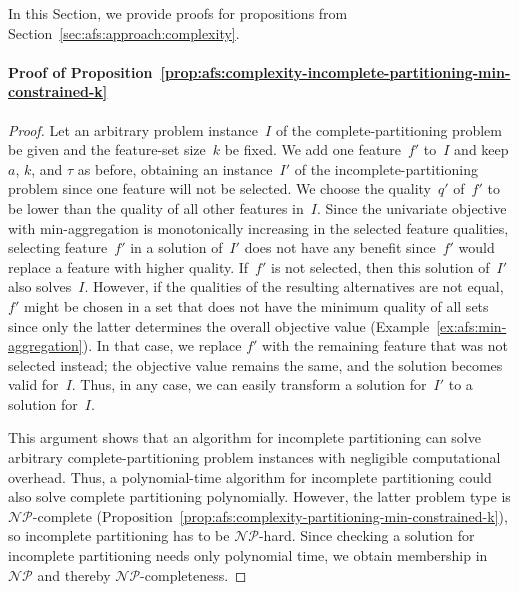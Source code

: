 \documentclass[iicol, sn-basic, Numbered]{sn-jnl} %
\theoremstyle{plain}
\theoremstyle{definition}
\begin{document}
\begin{appendices}
In this Section, we provide proofs for propositions from Section~\ref{sec:afs:approach:complexity}.

\paragraph{Proof of Proposition~\ref{prop:afs:complexity-incomplete-partitioning-min-constrained-k}}
%
\begin{proof}
	Let an arbitrary problem instance~$I$ of the complete-partitioning problem be given and the feature-set size~$k$ be fixed.
	We add one feature~$f'$ to~$I$ and keep $a$, $k$, and $\tau$ as before, obtaining an instance~$I'$ of the incomplete-partitioning problem since one feature will not be selected.
	We choose the quality~$q'$ of~$f'$ to be lower than the quality of all other features in~$I$.
	Since the univariate objective with min-aggregation is monotonically increasing in the selected feature qualities, selecting feature~$f'$ in a solution of~$I'$ does not have any benefit since~$f'$ would replace a feature with higher quality.
	If~$f'$ is not selected, then this solution of~$I'$ also solves~$I$.
	However, if the qualities of the resulting alternatives are not equal, $f'$ might be chosen in a set that does not have the minimum quality of all sets since only the latter determines the overall objective value (Example~\ref{ex:afs:min-aggregation}).
	In that case, we replace $f'$ with the remaining feature that was not selected instead; the objective value remains the same, and the solution becomes valid for~$I$.
	Thus, in any case, we can easily transform a solution for~$I'$ to a solution for~$I$.

	This argument shows that an algorithm for incomplete partitioning can solve arbitrary complete-partitioning problem instances with negligible computational overhead.
	Thus, a polynomial-time algorithm for incomplete partitioning could also solve complete partitioning polynomially.
	However, the latter problem type is $\mathcal{NP}$-complete (Proposition~\ref{prop:afs:complexity-partitioning-min-constrained-k}), so incomplete partitioning has to be $\mathcal{NP}$-hard.
	Since checking a solution for incomplete partitioning needs only polynomial time, we obtain membership in $\mathcal{NP}$ and thereby $\mathcal{NP}$-completeness.
\end{proof}


\end{appendices}
\end{document}
